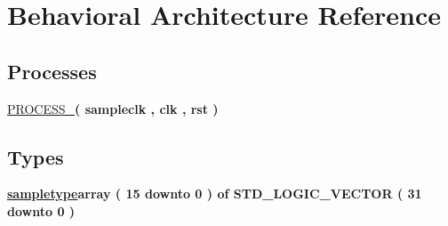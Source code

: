 \hypertarget{class_decimator_1_1_behavioral}{\section{Behavioral Architecture Reference}
\label{class_decimator_1_1_behavioral}
}
\subsection*{Processes}
 \begin{DoxyCompactItemize}
\item 
\hypertarget{class_decimator_1_1_behavioral_afd50a8c0ddd9d7e02a2ead90def64f30}{\hyperlink{class_decimator_1_1_behavioral_afd50a8c0ddd9d7e02a2ead90def64f30}{P\-R\-O\-C\-E\-S\-S\-\_}{\bfseries  ( {\bfseries \textcolor{vhdlchar}{sampleclk}\textcolor{vhdlchar}{ }\textcolor{vhdlchar}{ }\textcolor{vhdlchar}{ }} , {\bfseries \textcolor{vhdlchar}{clk}\textcolor{vhdlchar}{ }\textcolor{vhdlchar}{ }} , {\bfseries \textcolor{vhdlchar}{rst}\textcolor{vhdlchar}{ }} )}}\label{class_decimator_1_1_behavioral_afd50a8c0ddd9d7e02a2ead90def64f30}

\end{DoxyCompactItemize}
\subsection*{Types}
 \begin{DoxyCompactItemize}
\item 
\hypertarget{class_decimator_1_1_behavioral_afbfef90a80ec38b587f383f75169e682}{{\bfseries \hyperlink{class_decimator_1_1_behavioral_afbfef90a80ec38b587f383f75169e682}{sampletype}{\bfseries \textcolor{vhdlkeyword}{array}\textcolor{vhdlchar}{ }\textcolor{vhdlchar}{(}\textcolor{vhdlchar}{ } \textcolor{vhdldigit}{15} \textcolor{vhdlchar}{ }\textcolor{vhdlchar}{ }\textcolor{vhdlchar}{ }\textcolor{vhdlkeyword}{downto}\textcolor{vhdlchar}{ }\textcolor{vhdlchar}{ }\textcolor{vhdlchar}{ } \textcolor{vhdldigit}{0} \textcolor{vhdlchar}{ }\textcolor{vhdlchar}{)}\textcolor{vhdlchar}{ }\textcolor{vhdlchar}{ }\textcolor{vhdlkeyword}{of}\textcolor{vhdlchar}{ }\textcolor{comment}{S\-T\-D\-\_\-\-L\-O\-G\-I\-C\-\_\-\-V\-E\-C\-T\-O\-R}\textcolor{vhdlchar}{ }\textcolor{vhdlchar}{(}\textcolor{vhdlchar}{ } \textcolor{vhdldigit}{31} \textcolor{vhdlchar}{ }\textcolor{vhdlchar}{ }\textcolor{vhdlchar}{ }\textcolor{vhdlkeyword}{downto}\textcolor{vhdlchar}{ }\textcolor{vhdlchar}{ }\textcolor{vhdlchar}{ } \textcolor{vhdldigit}{0} \textcolor{vhdlchar}{ }\textcolor{vhdlchar}{)}\textcolor{vhdlchar}{ }}} }\label{class_decimator_1_1_behavioral_afbfef90a80ec38b587f383f75169e682}

\end{DoxyCompactItemize}
